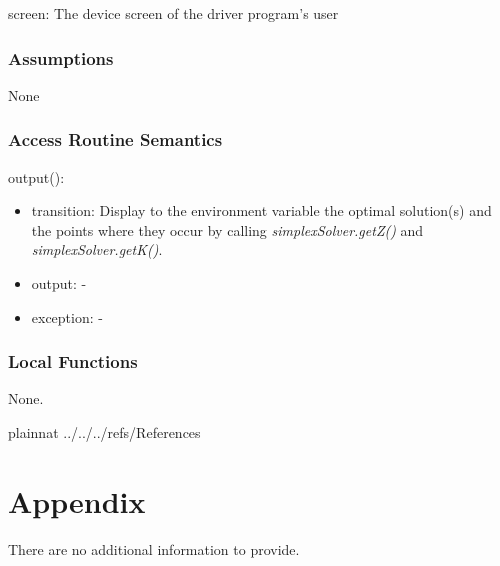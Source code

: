 \documentclass[12pt, titlepage]{article}
\begin{document}
screen: The device screen of the driver program's user

\subsubsection{Assumptions}

None

\subsubsection{Access Routine Semantics}

\noindent 
output():
\begin{itemize}
	\item transition: Display to the environment variable the optimal 
	solution(s) and the points where they occur by calling 
	\textit{simplexSolver.getZ()} and \textit{simplexSolver.getK()}.
	\item output: -
	\item exception: -
\end{itemize}

\subsubsection{Local Functions}

None.

\newpage

 {plainnat}
 {../../../refs/References}

\newpage

\section{Appendix} \label{Appendix}

There are no additional information to provide.
\end{document}

